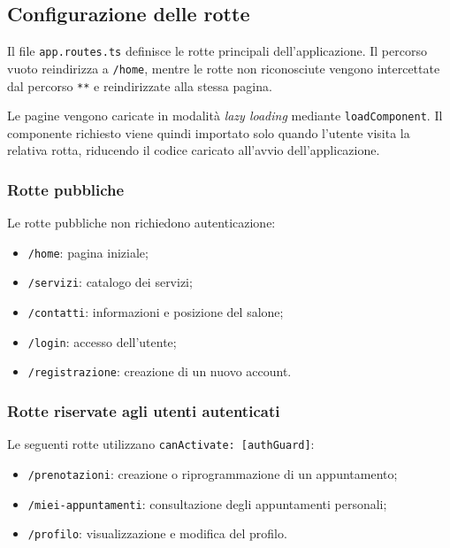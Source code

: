 \documentclass[12pt,a4paper]{article}
\begin{document}
\subsection{Configurazione delle rotte}
Il file \texttt{app.routes.ts} definisce le rotte principali
dell'applicazione. Il percorso vuoto reindirizza a \texttt{/home}, mentre le
rotte non riconosciute vengono intercettate dal percorso \texttt{**} e
reindirizzate alla stessa pagina.

Le pagine vengono caricate in modalità \textit{lazy loading} mediante
\texttt{loadComponent}. Il componente richiesto viene quindi importato solo
quando l'utente visita la relativa rotta, riducendo il codice caricato
all'avvio dell'applicazione.

\subsubsection{Rotte pubbliche}
Le rotte pubbliche non richiedono autenticazione:
\begin{itemize}
    \item \texttt{/home}: pagina iniziale;
    \item \texttt{/servizi}: catalogo dei servizi;
    \item \texttt{/contatti}: informazioni e posizione del salone;
    \item \texttt{/login}: accesso dell'utente;
    \item \texttt{/registrazione}: creazione di un nuovo account.
\end{itemize}

\subsubsection{Rotte riservate agli utenti autenticati}
Le seguenti rotte utilizzano \texttt{canActivate: [authGuard]}:
\begin{itemize}
    \item \texttt{/prenotazioni}: creazione o riprogrammazione di un appuntamento;
    \item \texttt{/miei-appuntamenti}: consultazione degli appuntamenti personali;
    \item \texttt{/profilo}: visualizzazione e modifica del profilo.
\end{itemize}
\end{document}
